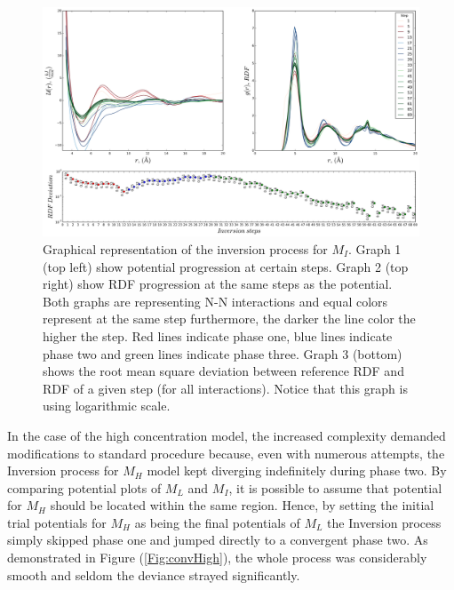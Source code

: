 \documentclass[10pt,a4paper,twoside]{article}
\begin{document}
\begin{figure}[H]
  \begin{center}
	\includegraphics[width=1 \textwidth]{./graphs/ConvI}
	\caption{Graphical representation of the inversion process for $M_I$. Graph 1 (top left) show potential progression at certain steps. Graph 2 (top right) show RDF progression at the same steps as the potential. Both graphs are representing N-N interactions and equal colors represent at the same step furthermore, the darker the line color the higher the step. Red lines indicate phase one, blue lines indicate phase two and green lines indicate phase three.  Graph 3 (bottom) shows the root mean square deviation between reference RDF and RDF of a given step (for all interactions). Notice that this graph is using logarithmic scale.}
	\label{Fig:convI}
  \end{center}
\end{figure} 

\label{subsec:discexp2}
In the case of the high concentration model, the increased complexity demanded modifications to standard procedure because, even with numerous attempts, the Inversion process for $M_H$ model kept diverging indefinitely during phase two. By comparing potential plots of $M_L$ and $M_I$, it is possible to assume that potential for $M_H$ should be located within the same region. Hence, by setting the initial trial potentials for $M_H$ as being the final potentials of $M_L$ the Inversion process simply skipped phase one and jumped directly to a convergent phase two. As demonstrated in Figure (\ref{Fig:convHigh}), the whole process was considerably smooth and seldom the deviance strayed significantly.
\end{document}
